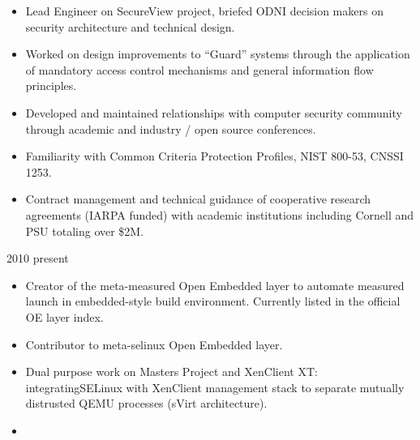 \documentclass[letterpaper,11pt]{article}
\begin{document}
      \begin {itemize}
        \setlength {\itemsep}{1pt}
        \setlength {\parskip}{0pt}
        \setlength {\parsep}{0pt}
      \item Lead Engineer on SecureView project, briefed ODNI decision makers on security architecture and technical design.
      \item Worked on design improvements to ``Guard'' systems through the application of mandatory access control mechanisms and general information flow principles.
      \item Developed and maintained relationships with computer security community through academic and industry / open source conferences.
      \item Familiarity with Common Criteria Protection Profiles, NIST 800-53, CNSSI 1253.
      \item Contract management and technical guidance of cooperative research agreements (IARPA funded) with academic institutions including Cornell and PSU totaling over \$2M.
      \end {itemize}
       {2010} {present}
      \begin {itemize}
        \setlength {\itemsep}{1pt}
        \setlength {\parskip}{0pt}
        \setlength {\parsep}{0pt}
      \item Creator of the meta-measured Open Embedded layer to automate measured launch in embedded-style build environment. Currently listed in the official OE layer index.
      \item Contributor to meta-selinux Open Embedded layer.
      \item Dual purpose work on Masters Project and XenClient XT: integratingSELinux with XenClient management stack to separate mutually distrusted QEMU processes (sVirt architecture).
      \end {itemize}
      \pagebreak
    \begin{itemize}
    \item[]
    \end{itemize}
\end{document}
